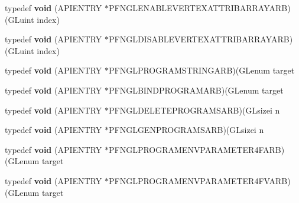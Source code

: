 \begin{DoxyCompactItemize}
\item 
\hypertarget{class_c_p_v_r_tgles_ext_a3ce477c83385a0c3215b16347cf3f517}{typedef {\bfseries void} (A\+P\+I\+E\+N\+T\+R\+Y $\ast$P\+F\+N\+G\+L\+E\+N\+A\+B\+L\+E\+V\+E\+R\+T\+E\+X\+A\+T\+T\+R\+I\+B\+A\+R\+R\+A\+Y\+A\+R\+B)(G\+Luint index)}\label{class_c_p_v_r_tgles_ext_a3ce477c83385a0c3215b16347cf3f517}

\item 
\hypertarget{class_c_p_v_r_tgles_ext_af8e3f6103d27bf47c91d9180fb499aa1}{typedef {\bfseries void} (A\+P\+I\+E\+N\+T\+R\+Y $\ast$P\+F\+N\+G\+L\+D\+I\+S\+A\+B\+L\+E\+V\+E\+R\+T\+E\+X\+A\+T\+T\+R\+I\+B\+A\+R\+R\+A\+Y\+A\+R\+B)(G\+Luint index)}\label{class_c_p_v_r_tgles_ext_af8e3f6103d27bf47c91d9180fb499aa1}

\item 
\hypertarget{class_c_p_v_r_tgles_ext_a465429d47b58b1b1166127550d45b772}{typedef {\bfseries void} (A\+P\+I\+E\+N\+T\+R\+Y $\ast$P\+F\+N\+G\+L\+P\+R\+O\+G\+R\+A\+M\+S\+T\+R\+I\+N\+G\+A\+R\+B)(G\+Lenum target}\label{class_c_p_v_r_tgles_ext_a465429d47b58b1b1166127550d45b772}

\item 
\hypertarget{class_c_p_v_r_tgles_ext_ae2726a44a5d5e017041fb0355392ceb3}{typedef {\bfseries void} (A\+P\+I\+E\+N\+T\+R\+Y $\ast$P\+F\+N\+G\+L\+B\+I\+N\+D\+P\+R\+O\+G\+R\+A\+M\+A\+R\+B)(G\+Lenum target}\label{class_c_p_v_r_tgles_ext_ae2726a44a5d5e017041fb0355392ceb3}

\item 
\hypertarget{class_c_p_v_r_tgles_ext_afe9a1b524c0d2b8e5bbad8a8b7fc1151}{typedef {\bfseries void} (A\+P\+I\+E\+N\+T\+R\+Y $\ast$P\+F\+N\+G\+L\+D\+E\+L\+E\+T\+E\+P\+R\+O\+G\+R\+A\+M\+S\+A\+R\+B)(G\+Lsizei n}\label{class_c_p_v_r_tgles_ext_afe9a1b524c0d2b8e5bbad8a8b7fc1151}

\item 
\hypertarget{class_c_p_v_r_tgles_ext_a516d5210b9d87d6bbec25f1697c63b99}{typedef {\bfseries void} (A\+P\+I\+E\+N\+T\+R\+Y $\ast$P\+F\+N\+G\+L\+G\+E\+N\+P\+R\+O\+G\+R\+A\+M\+S\+A\+R\+B)(G\+Lsizei n}\label{class_c_p_v_r_tgles_ext_a516d5210b9d87d6bbec25f1697c63b99}

\item 
\hypertarget{class_c_p_v_r_tgles_ext_a7182f37d5ff889234fbf19a2e0711bb9}{typedef {\bfseries void} (A\+P\+I\+E\+N\+T\+R\+Y $\ast$P\+F\+N\+G\+L\+P\+R\+O\+G\+R\+A\+M\+E\+N\+V\+P\+A\+R\+A\+M\+E\+T\+E\+R4\+F\+A\+R\+B)(G\+Lenum target}\label{class_c_p_v_r_tgles_ext_a7182f37d5ff889234fbf19a2e0711bb9}

\item 
\hypertarget{class_c_p_v_r_tgles_ext_a5dea135167ad658a62458c9d822dc5e8}{typedef {\bfseries void} (A\+P\+I\+E\+N\+T\+R\+Y $\ast$P\+F\+N\+G\+L\+P\+R\+O\+G\+R\+A\+M\+E\+N\+V\+P\+A\+R\+A\+M\+E\+T\+E\+R4\+F\+V\+A\+R\+B)(G\+Lenum target}\label{class_c_p_v_r_tgles_ext_a5dea135167ad658a62458c9d822dc5e8}


\end{DoxyCompactItemize}
